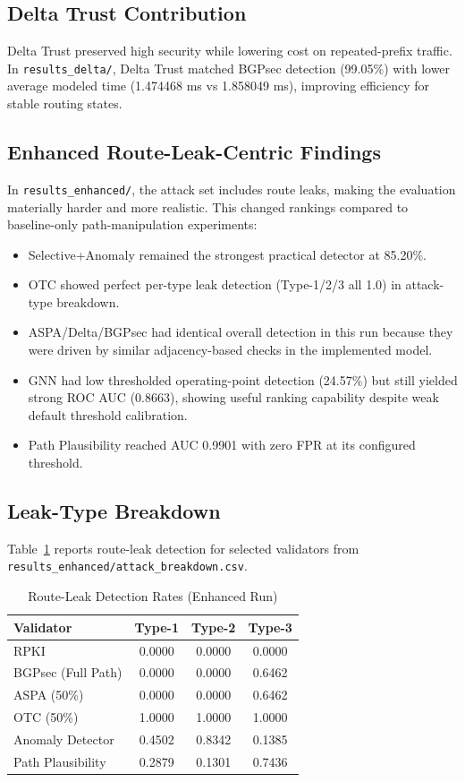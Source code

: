\documentclass[conference]{IEEEtran}
\begin{document}
\subsection{Delta Trust Contribution}
Delta Trust preserved high security while lowering cost on repeated-prefix traffic. In \texttt{results\_delta/}, Delta Trust matched BGPsec detection (99.05\%) with lower average modeled time (1.474468 ms vs 1.858049 ms), improving efficiency for stable routing states.

\subsection{Enhanced Route-Leak-Centric Findings}
In \texttt{results\_enhanced/}, the attack set includes route leaks, making the evaluation materially harder and more realistic. This changed rankings compared to baseline-only path-manipulation experiments:
\begin{itemize}
\item Selective+Anomaly remained the strongest practical detector at 85.20\%.
\item OTC showed perfect per-type leak detection (Type-1/2/3 all 1.0) in attack-type breakdown.
\item ASPA/Delta/BGPsec had identical overall detection in this run because they were driven by similar adjacency-based checks in the implemented model.
\item GNN had low thresholded operating-point detection (24.57\%) but still yielded strong ROC AUC (0.8663), showing useful ranking capability despite weak default threshold calibration.
\item Path Plausibility reached AUC 0.9901 with zero FPR at its configured threshold.
\end{itemize}

\subsection{Leak-Type Breakdown}
Table~\ref{tab:leak_breakdown} reports route-leak detection for selected validators from \texttt{results\_enhanced/attack\_breakdown.csv}.

\begin{table}[t]
\caption{Route-Leak Detection Rates (Enhanced Run)}
\label{tab:leak_breakdown}
\centering
\begin{tabular}{@{}lccc@{}}
\toprule
\textbf{Validator} & \textbf{Type-1} & \textbf{Type-2} & \textbf{Type-3} \\
\midrule
RPKI & 0.0000 & 0.0000 & 0.0000 \\
BGPsec (Full Path) & 0.0000 & 0.0000 & 0.6462 \\
ASPA (50\%) & 0.0000 & 0.0000 & 0.6462 \\
OTC (50\%) & 1.0000 & 1.0000 & 1.0000 \\
Anomaly Detector & 0.4502 & 0.8342 & 0.1385 \\
Path Plausibility & 0.2879 & 0.1301 & 0.7436 \\
\bottomrule
\end{tabular}
\end{table}
\end{document}
